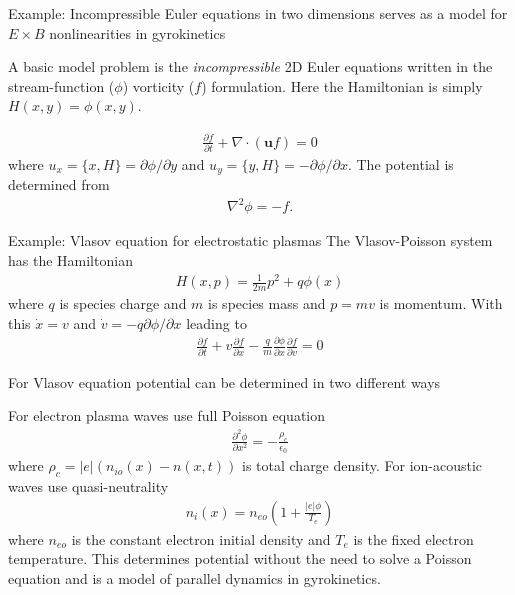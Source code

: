 \documentclass[pdf]{beamer}
\newcommand{\pfrac}[2]{\frac{\partial #1}{\partial #2}}
\newcommand{\mvec}[1]{\mathbf{#1}}
\theoremstyle{definition}
\begin{document}
\begin{frame}{Example: Incompressible Euler equations in two
    dimensions serves as a model for $E\times B$ nonlinearities in
    gyrokinetics}%

  A basic model problem is the \emph{incompressible} 2D Euler
  equations written in the stream-function ($\phi$) vorticity ($f$)
  formulation. Here the Hamiltonian is simply $H(x,y) = \phi(x,y)$.

  \begin{align*}
    \pfrac{f}{t} + \nabla\cdot(\mvec{u}f) = 0
  \end{align*}
  where $u_x = \{x,H\} = \partial\phi/\partial y$ and $u_y = \{y,H\} =
  -\partial\phi/\partial x$. The potential is determined from
  \begin{align*}
    \nabla^2 \phi = -f.
  \end{align*}
\end{frame}

\begin{frame}{Example: Vlasov equation for electrostatic plasmas}%
  The Vlasov-Poisson system has the Hamiltonian
  \begin{align*}
    H(x,p) = \frac{1}{2m}p^2 + q\phi(x)
  \end{align*}
  where $q$ is species charge and $m$ is species mass and $p=mv$ is
  momentum. With this $\dot{x} = v$ and $\dot{v} =
  -q\partial\phi/\partial x$ leading to
  \begin{align*}
    \pfrac{f}{t} + v\pfrac{f}{x} -
    \frac{q}{m}\pfrac{\phi}{x}\pfrac{f}{v} = 0
  \end{align*}
\end{frame}

\begin{frame}{For Vlasov equation potential can be determined in two
    different ways}%

  For electron plasma waves use full Poisson equation
  \begin{align*}
    \frac{\partial^2 \phi}{\partial x^2} = -\frac{\rho_c}{\epsilon_0}
  \end{align*}
  where $\rho_c = |e| (n_{io}(x) - n(x,t))$ is total charge
  density. For ion-acoustic waves use quasi-neutrality
  \begin{align*}
    n_{i}(x) = n_{eo}\left(1 + \frac{|e|\phi}{T_e}\right)
  \end{align*}
  where $n_{eo}$ is the constant electron initial density and $T_e$ is
  the fixed electron temperature. This determines potential without
  the need to solve a Poisson equation and is a model of parallel
  dynamics in gyrokinetics.

\end{frame}
\end{document}
